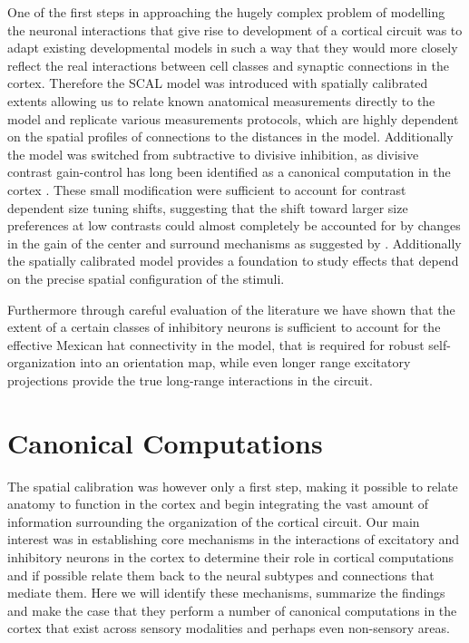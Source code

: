 One of the first steps in approaching the hugely complex problem of
modelling the neuronal interactions that give rise to development of a
cortical circuit was to adapt existing developmental models in such a
way that they would more closely reflect the real interactions between
cell classes and synaptic connections in the cortex. Therefore the
SCAL model was introduced with spatially calibrated extents allowing
us to relate known anatomical measurements directly to the model and
replicate various measurements protocols, which are highly dependent
on the spatial profiles of connections to the distances in the
model. Additionally the model was switched from subtractive to
divisive inhibition, as divisive contrast gain-control has long been
identified as a canonical computation in the cortex
\citep{Carandini2012}. These small modification were sufficient to
account for contrast dependent size tuning shifts, suggesting that the
shift toward larger size preferences at low contrasts could almost
completely be accounted for by changes in the gain of the center and
surround mechanisms as suggested by \cite{Cavanaugh2002}. Additionally
the spatially calibrated model provides a foundation to study effects
that depend on the precise spatial configuration of the stimuli.

Furthermore through careful evaluation of the literature we have shown
that the extent of a certain classes of inhibitory neurons is
sufficient to account for the effective Mexican hat connectivity in
the model, that is required for robust self-organization into an
orientation map, while even longer range excitatory projections
provide the true long-range interactions in the circuit.

\section{Canonical Computations}

The spatial calibration was however only a first step, making it
possible to relate anatomy to function in the cortex and begin
integrating the vast amount of information surrounding the
organization of the cortical circuit. Our main interest was in
establishing core mechanisms in the interactions of excitatory and
inhibitory neurons in the cortex to determine their role in cortical
computations and if possible relate them back to the neural subtypes
and connections that mediate them. Here we will identify these
mechanisms, summarize the findings and make the case that they perform
a number of canonical computations in the cortex that exist across
sensory modalities and perhaps even non-sensory areas.

